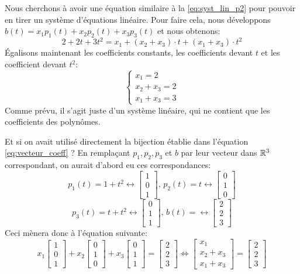 Nous cherchons à avoir une équation similaire à la \ref{eq:syst_lin_p2} pour pouvoir en tirer un système d'équations linéaire. Pour faire cela, nous développons $b(t) = x_1 p_1(t) + x_2 p_2 (t) + x_3 p_3 (t)$ et nous obtenons:
$$2+2t+3t^2 = x_1 + (x_2 + x_3) \cdot t + (x_1 + x_3) \cdot t^2$$
Égalisons maintenant les coefficients constants, les coefficients devant $t$ et les coefficient devant $t^2$:
$$\begin{cases}
x_1 = 2 \\
x_2 + x_3 = 2 \\
x_1 + x_3 = 3
\end{cases}$$
Comme prévu, il s'agit juste d'un système linéaire, qui ne contient que les coefficients des polynômes. 

Et si on avait utilisé directement la bijection établie dans l'équation \ref{eq:vecteur_coeff} ? En remplaçant $p_1, p_2, p_3$ et $b$ par leur vecteur dans $\mathbb{R}^3$ correspondant, on aurait d'abord eu ces correspondances:
$$p_1(t) = 1+t^2 \longleftrightarrow \begin{bmatrix} 1\\0\\1 \end{bmatrix}, \, p_2(t) = t \longleftrightarrow \begin{bmatrix} 0\\1\\0 \end{bmatrix}$$ 
$$p_3(t) = t+t^2 \longleftrightarrow \begin{bmatrix} 0\\1\\1 \end{bmatrix}, \, b(t) = \longleftrightarrow \begin{bmatrix} 2\\2\\3 \end{bmatrix}$$
Ceci mènera donc à l'équation suivante:
$$x_1 \begin{bmatrix} 1\\0\\1 \end{bmatrix} + x_2 \begin{bmatrix} 0\\1\\0 \end{bmatrix} + x_3 \begin{bmatrix} 0\\1\\1 \end{bmatrix} = \begin{bmatrix} 2\\2\\3 \end{bmatrix}
\iff 
\begin{bmatrix} x_1 \\ x_2 + x_3 \\ x_1 + x_3 \end{bmatrix} = \begin{bmatrix} 2 \\ 2 \\ 3\end{bmatrix} $$
